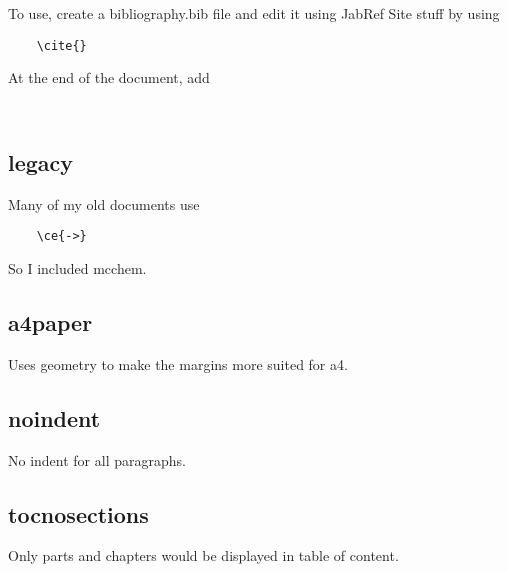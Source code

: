 \documentclass{article}
\begin{document}
To use, create a bibliography.bib file and edit it using JabRef
Site stuff by using 
\begin{verbatim}
	\cite{}
\end{verbatim}
At the end of the document, add 
\begin{verbatim}
	
\end{verbatim}

\subsection{legacy}

Many of my old documents use 

\begin{verbatim}
	\ce{->}
\end{verbatim}

So I included mcchem.

\subsection{a4paper}

Uses geometry to make the margins more suited for a4.

\subsection{noindent}

No indent for all paragraphs.

\subsection{tocnosections}

Only parts and chapters would be displayed in table of content.
\end{document}
